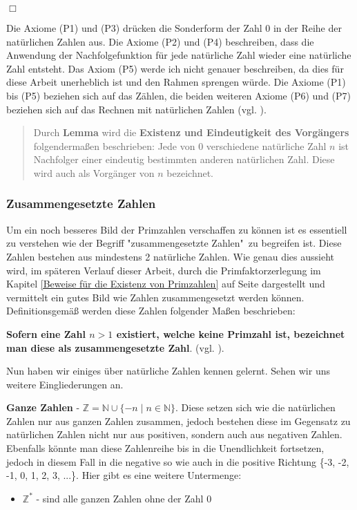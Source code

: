 \documentclass[12pt,a4paper]{article}
\theoremstyle{definition}
\begin{document}
\begin{flushright}
$\Box$
\end{flushright}
Die Axiome (P1) und (P3) drücken die Sonderform der Zahl 0 in der Reihe der natürlichen Zahlen aus.
Die Axiome (P2) und (P4) beschreiben, dass die Anwendung der Nachfolgefunktion für jede natürliche Zahl wieder eine natürliche Zahl entsteht.
Das Axiom (P5) werde ich nicht genauer beschreiben, da dies für diese Arbeit unerheblich ist und den Rahmen sprengen würde.
Die Axiome (P1) bis (P5) beziehen sich auf das Zählen, die beiden weiteren Axiome (P6) und (P7) beziehen sich auf das Rechnen mit natürlichen Zahlen (vgl. \cite[84--85]{Steffen2013}).

\begin{quote}
\small
Durch \textbf{Lemma} wird die \textbf{Existenz und Eindeutigkeit des Vorgängers} folgendermaßen beschrieben:\newline
Jede von 0 verschiedene natürliche Zahl $n$ ist Nachfolger einer eindeutig bestimmten anderen natürlichen Zahl. Diese wird auch als Vorgänger von $n$ bezeichnet.\newline
\autocite[85]{Steffen2013}
\end{quote}

\subsubsection{Zusammengesetzte Zahlen}\label{Zusammengesetzte Zahlen}
Um ein noch besseres Bild der Primzahlen verschaffen zu können ist es essentiell zu verstehen wie der Begriff "{zusammengesetzte Zahlen}"\ zu begreifen ist.
Diese Zahlen bestehen aus mindestens 2 natürliche Zahlen.
Wie genau dies aussieht wird, im späteren Verlauf dieser Arbeit, durch die Primfaktorzerlegung im Kapitel \ref{Beweise für die Existenz von Primzahlen} auf Seite \pageref{Primfaktorzerlegung} dargestellt und vermittelt ein gutes Bild wie Zahlen zusammengesetzt werden können.
Definitionsgemäß werden diese Zahlen folgender Maßen beschrieben:

\textbf{Sofern eine Zahl $n > 1$ existiert, welche keine Primzahl ist, bezeichnet man diese als zusammengesetzte Zahl}.
(vgl. \cite[13]{RempeGillen2009}).

Nun haben wir einiges über natürliche Zahlen kennen gelernt. Sehen wir uns weitere Eingliederungen an.

\textbf{Ganze Zahlen} - $\mathbb{Z} = \mathbb{N} \cup \{-n \mid n \in \mathbb{N}\}$.\newline
Diese setzen sich wie die natürlichen Zahlen nur aus ganzen Zahlen zusammen, jedoch bestehen diese im Gegensatz zu natürlichen Zahlen nicht nur aus positiven, sondern auch aus negativen Zahlen.
Ebenfalls könnte man diese Zahlenreihe bis in die Unendlichkeit fortsetzen, jedoch in diesem Fall in die negative so wie auch in die positive Richtung \{-3, -2, -1, 0, 1, 2, 3, ...\}.
Hier gibt es eine weitere Untermenge:
\begin{itemize}
\item $\mathbb{Z}^*$ - sind alle ganzen Zahlen ohne der Zahl 0
\end{itemize}
\end{document}

